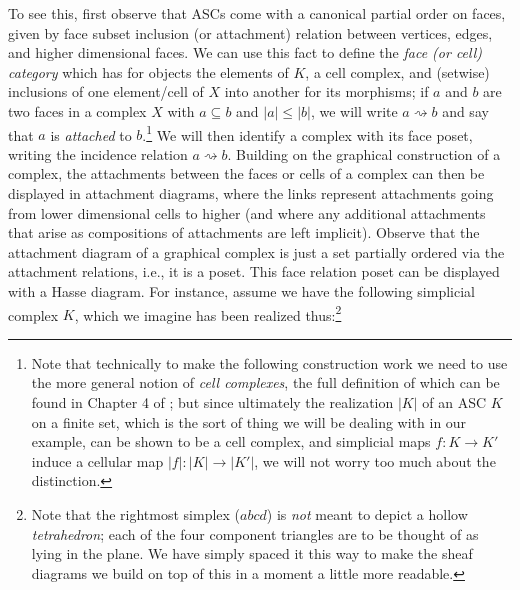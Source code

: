 \documentclass[11pt]{book}
\theoremstyle{definition}
\theoremstyle{definition}
\theoremstyle{definition}
\theoremstyle{theorem}
\theoremstyle{definition}
\begin{document}
To see this, first observe that ASCs come with a canonical partial order on faces, given by face subset inclusion (or attachment) relation between vertices, edges, and higher dimensional faces. We can use this fact to define the \textit{face (or cell) category} which has for objects the elements of $K$, a cell complex, and (setwise) inclusions of one element/cell of $X$ into another for its morphisms; if $a$ and $b$ are two faces in a complex $X$ with $a \subseteq b$ and $|a| \leq |b|$, we will write $a \rightsquigarrow b$ and say that $a$ is \textit{attached} to $b$.\footnote{Note that technically to make the following construction work we need to use the more general notion of \textit{cell complexes}, the full definition of which can be found in Chapter 4 of \cite{curry_sheaves_2013}; but since ultimately the realization $|K|$ of an ASC $K$ on a finite set, which is the sort of thing we will be dealing with in our example, can be shown to be a cell complex, and simplicial maps $f: K \rightarrow K'$ induce a cellular map $|f|: |K| \rightarrow |K'|$, we will not worry too much about the distinction.} We will then identify a complex with its face poset, writing the incidence relation $a \rightsquigarrow b$. Building on the graphical construction of a complex, the attachments between the faces or cells of a complex can then be displayed in attachment diagrams, where the links represent attachments going from lower dimensional cells to higher (and where any additional attachments that arise as compositions of attachments are left implicit). Observe that the attachment diagram of a graphical complex is just a set partially ordered via the attachment relations, i.e., it is a poset. This face relation poset can be displayed with a Hasse diagram. For instance, assume we have the following simplicial complex $K$, which we imagine has been realized thus:\footnote{Note that the rightmost simplex ($abcd$) is \textit{not} meant to depict a hollow \textit{tetrahedron}; each of the four component triangles are to be thought of as lying in the plane. We have simply spaced it this way to make the sheaf diagrams we build on top of this in a moment a little more readable.} 
\end{document}
